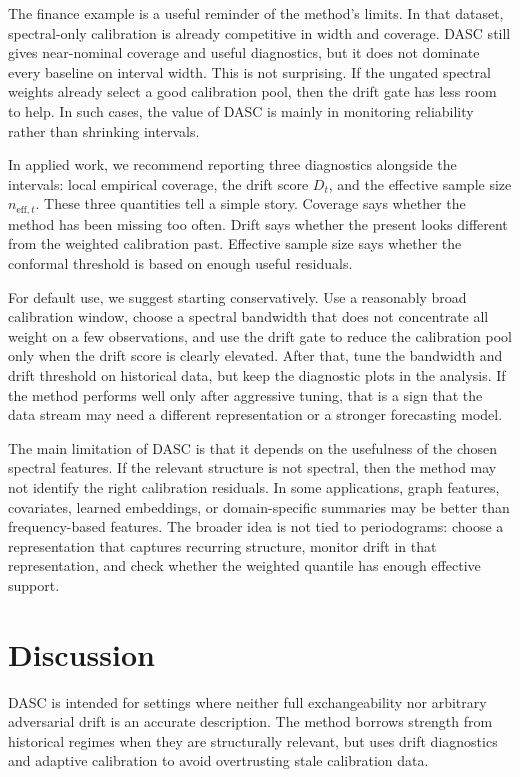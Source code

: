\documentclass[11pt]{article}
\begin{document}
The finance example is a useful reminder of the method's limits. In that dataset, spectral-only calibration is already competitive in width and coverage. DASC still gives near-nominal coverage and useful diagnostics, but it does not dominate every baseline on interval width. This is not surprising. If the ungated spectral weights already select a good calibration pool, then the drift gate has less room to help. In such cases, the value of DASC is mainly in monitoring reliability rather than shrinking intervals.

In applied work, we recommend reporting three diagnostics alongside the intervals: local empirical coverage, the drift score $D_t$, and the effective sample size $n_{\mathrm{eff},t}$. These three quantities tell a simple story. Coverage says whether the method has been missing too often. Drift says whether the present looks different from the weighted calibration past. Effective sample size says whether the conformal threshold is based on enough useful residuals.

For default use, we suggest starting conservatively. Use a reasonably broad calibration window, choose a spectral bandwidth that does not concentrate all weight on a few observations, and use the drift gate to reduce the calibration pool only when the drift score is clearly elevated. After that, tune the bandwidth and drift threshold on historical data, but keep the diagnostic plots in the analysis. If the method performs well only after aggressive tuning, that is a sign that the data stream may need a different representation or a stronger forecasting model.

The main limitation of DASC is that it depends on the usefulness of the chosen spectral features. If the relevant structure is not spectral, then the method may not identify the right calibration residuals. In some applications, graph features, covariates, learned embeddings, or domain-specific summaries may be better than frequency-based features. The broader idea is not tied to periodograms: choose a representation that captures recurring structure, monitor drift in that representation, and check whether the weighted quantile has enough effective support.

\section{Discussion}

DASC is intended for settings where neither full exchangeability nor arbitrary adversarial drift is an accurate description. The method borrows strength from historical regimes when they are structurally relevant, but uses drift diagnostics and adaptive calibration to avoid overtrusting stale calibration data.
\end{document}

